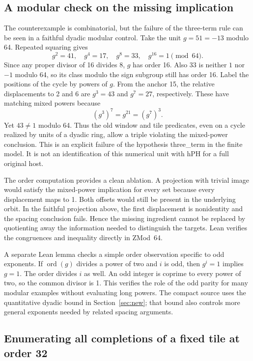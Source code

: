 \documentclass[12pt,letterpaper]{article}
\DeclareRobustCommand{\id}[1]{\mbox{\small\ttfamily #1}}
\begin{document}
\subsection{A modular check on the missing implication}

The counterexample is combinatorial, but the failure of the three-term rule can be seen in a faithful dyadic modular control. Take the unit $g=51=-13$ modulo 64. Repeated squaring gives
\[
 g^2=41,\quad g^4=17,\quad g^8=33,\quad g^{16}=1\pmod{64}.
\]
Since any proper divisor of 16 divides 8, $g$ has order 16. Also $33$ is neither $1$ nor $-1$ modulo 64, so its class modulo the sign subgroup still has order 16. Label the positions of the cycle by powers of $g$. From the anchor 15, the relative displacements to 2 and 6 are $g^3=43$ and $g^7=27$, respectively. These have matching mixed powers because
\[
       (g^3)^7=g^{21}=(g^7)^3 .
\]
Yet $43\ne1$ modulo 64. Thus the old window and tile predicates, even on a cycle realized by units of a dyadic ring, allow a triple violating the mixed-power conclusion. This is an explicit failure of the hypothesis \id{three\_term} in the finite model. It is not an identification of this numerical unit with \id{hPH} for a full original host.

The order computation provides a clean ablation. A projection with trivial image would satisfy the mixed-power implication for every set because every displacement maps to 1. Both offsets would still be present in the underlying orbit. In the faithful projection above, the first displacement is nonidentity and the spacing conclusion fails. Hence the missing ingredient cannot be replaced by quotienting away the information needed to distinguish the targets. Lean verifies the congruences and inequality directly in \id{ZMod 64}.

A separate Lean lemma checks a simple order observation specific to odd exponents. If $\operatorname{ord}(g)$ divides a power of two and $i$ is odd, then $g^i=1$ implies $g=1$. The order divides $i$ as well. An odd integer is coprime to every power of two, so the common divisor is 1. This verifies the role of the odd parity for many modular examples without evaluating long powers. The compact source uses the quantitative dyadic bound in Section~\ref{sec:new}; that bound also controls more general exponents needed by related spacing arguments.

\subsection{Enumerating all completions of a fixed tile at order 32}
\end{document}

